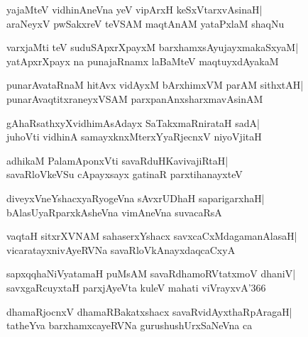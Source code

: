 \documentclass[twoside,12pt,openright]{book}
\newcounter{shloka}[chapter]
\begin{document}
\begin{shloka}%
yajaMteV vidhinAneVna yeV vipArxH keSxVtarxvAsinaH|\\
araNeyxV pwSakxreV teVSAM maqtAnAM yataPxlaM shaqNu
\end{shloka}

\begin{shloka}%
varxjaMti teV suduSApxrXpayxM barxhamxsAyujayxmakaSxyaM|\\
yatApxrXpayx na punajaRnamx laBaMteV maqtuyxdAyakaM
\end{shloka}

\begin{shloka}%
punarAvataRnaM hitAvx vidAyxM bArxhimxVM parAM sithxtAH|\\
punarAvaqtitxraneyxVSAM parxpanAnxsharxmavAsinAM
\end{shloka}

\begin{shloka}%
gAhaRsathxyXvidhimAsAdayx SaTakxmaRnirataH sadA|\\
juhoVti vidhinA samayxknxMterxYyaRjecnxV niyoVjitaH
\end{shloka}

\begin{shloka}%
adhikaM PalamAponxVti savaRduHKavivajiRtaH|\\
savaRloVkeVSu cApayxsayx gatinaR parxtihanayxteV
\end{shloka}

\begin{shloka}%
diveyxVneYshacxyaRyogeVna sAvxrUDhaH saparigarxhaH|\\
bAlasUyaRparxkAsheVna vimAneVna suvacaRsA
\end{shloka}

\begin{shloka}%
vaqtaH sitxrXVNAM sahaserxYshacx savxcaCxMdagamanAlasaH|\\
vicaratayxnivAyeRVNa savaRloVkAnayxdaqcaCxyA
\end{shloka}

\begin{shloka}%
sapxqqhaNiVyatamaH puMsAM savaRdhamoRVtatxmoV dhaniV|\\
savxgaRcuyxtaH parxjAyeVta kuleV mahati viVrayxvA\char'366
\end{shloka}

\begin{shloka}%
dhamaRjocnxV dhamaRBakatxshacx savaRvidAyxthaRpAragaH|\\
tatheYva barxhamxcayeRVNa gurushushUrxSaNeVna ca
\end{shloka}
\end{document}

